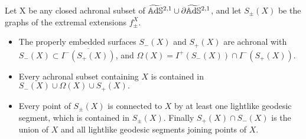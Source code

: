 \begin{lemma}\label{422}
    Let X be any closed achronal subset of $\widetilde{\mathbb{A}\mathrm{d}\mathbb{S}}{}^{2,1}\cup\partial\widetilde{\mathbb{A}\mathrm{d}\mathbb{S}}{}^{2,1}$, and let $S_\pm(X)$ be the graphs of the extremal extensions $f_\pm^X$. 
    \begin{itemize}
        \item The properly embedded surfaces $S_-(X)$ and $S_+(X)$ are achronal with $S_-(X)\subset \overline{I^-(S_+(X))}$, and $\Omega(X)=I^+(S_-(X))\cap I^-(S_+(X)).$
        \item Every achronal subset containing $X$ is contained in $S_-(X)\cup\Omega(X)\cup S_+(X).$
        \item Every point of $S_\pm(X)$ is connected to $X$ by at least one lightlike geodesic segment, which is contained in $S_\pm(X).$ Finally $S_+(X)\cap S_-(X)$ is the union of $X$ and all lightlike geodesic segments joining points of $X$.
    \end{itemize}
\end{lemma}
